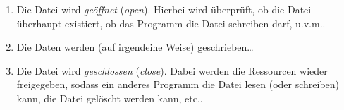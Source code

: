 		\begin{enumerate}
			\item Die Datei wird \textit{geöffnet} (\textit{open}). Hierbei wird überprüft, ob die Datei überhaupt existiert, ob das Programm die Datei schreiben darf, u.v.m..
			\item Die Daten werden (auf irgendeine Weise) geschrieben\dots
			\item Die Datei wird \textit{geschlossen} (\textit{close}). Dabei werden die Ressourcen wieder freigegeben, sodass ein anderes Programm die Datei lesen (oder schreiben) kann, die Datei gelöscht werden kann, etc..
		\end{enumerate}
		
